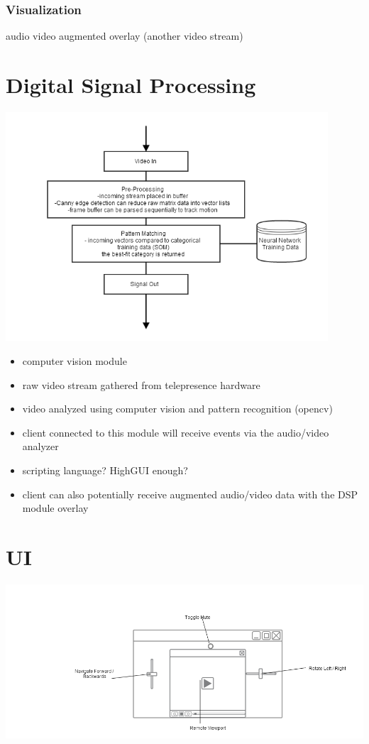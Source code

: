 \documentclass[a4paper,12pt]{report}
\begin{document}
		\subsubsection{Visualization}
			audio
			video
			augmented overlay (another video stream)


\section{Digital Signal Processing}
\includegraphics[width=12cm]{signalProcessing}
\begin{itemize}
	\item computer vision module
	\item raw video stream gathered from telepresence hardware
	\item video analyzed using computer vision and pattern recognition (opencv)
	\item client connected to this module will receive events via the audio/video analyzer
	\item scripting language? HighGUI enough?
	\item client can also potentially receive augmented audio/video data with the DSP module overlay
\end{itemize}
	
\section{UI}

\includegraphics[width=16cm]{MobileGUI_Labeled}
\end{document}
